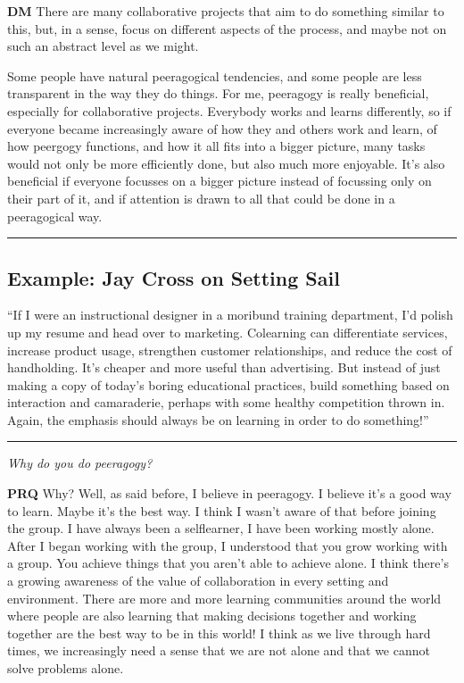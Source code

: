 \textbf{DM} There are many collaborative projects that aim to do
something similar to this, but, in a sense, focus on different aspects
of the process, and maybe not on such an abstract level as we might.

Some people have natural peeragogical tendencies, and some people are
less transparent in the way they do things. For me, peeragogy is really
beneficial, especially for collaborative projects. Everybody works and
learns differently, so if everyone became increasingly aware of how they
and others work and learn, of how peergogy functions, and how it all
fits into a bigger picture, many tasks would not only be more
efficiently done, but also much more enjoyable. It's also beneficial if
everyone focusses on a bigger picture instead of focussing only on their
part of it, and if attention is drawn to all that could be done in a
peeragogical way.

\begin{center}\rule{0.5\linewidth}{0.5pt}\end{center}

\hypertarget{example-jay-cross-on-setting-sail}{%
\subsection{Example: Jay Cross on Setting
Sail}\label{example-jay-cross-on-setting-sail}}

``If I were an instructional designer in a moribund training department,
I'd polish up my resume and head over to marketing. Co­learning can
differentiate services, increase product usage, strengthen customer
relationships, and reduce the cost of hand­holding. It's cheaper and
more useful than advertising. But instead of just making a copy of
today's boring educational practices, build something based on
interaction and camaraderie, perhaps with some healthy competition
thrown in. Again, the emphasis should always be on learning in order to
do something!''

\begin{center}\rule{0.5\linewidth}{0.5pt}\end{center}

\emph{Why do you do peeragogy?}

\textbf{PRQ} Why? Well, as said before, I believe in peeragogy. I
believe it's a good way to learn. Maybe it's the best way. I think I
wasn't aware of that before joining the group. I have always been a
self­learner, I have been working mostly alone. After I began working
with the group, I understood that you grow working with a group. You
achieve things that you aren't able to achieve alone. I think there's a
growing awareness of the value of collaboration in every setting and
environment. There are more and more learning communities around the
world where people are also learning that making decisions together and
working together are the best way to be in this world! I think as we
live through hard times, we increasingly need a sense that we are not
alone and that we cannot solve problems alone.

